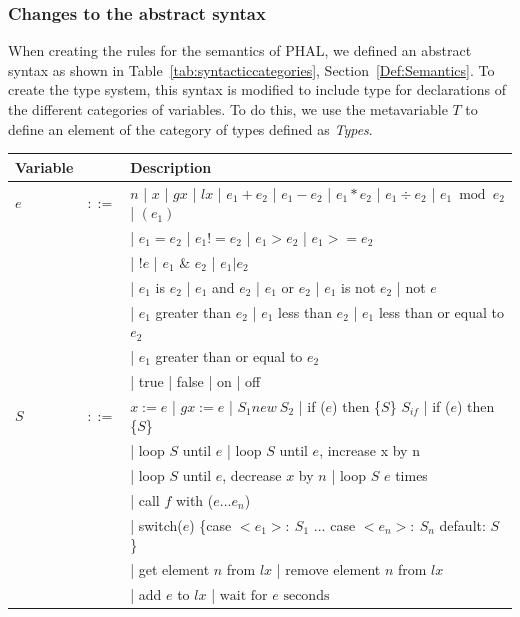 \subsubsection*{Changes to the abstract syntax}
When creating the rules for the semantics of PHAL, we defined an abstract syntax as shown in Table~\ref{tab:syntacticcategories}, Section~\ref{Def:Semantics}. To create the type system, this syntax is modified to include type for declarations of the different categories of variables. To do this, we use the metavariable $T$ to define an element of the category of types defined as \textit{Types}. 
\begin{table}[H]
\centering
\begin{tabular}{@{}lll@{}}
\toprule
Variable &       & Description                      \\ \midrule
$e$       & $::=$ &  $n$ | $x$ | $gx$ | $lx$ | $e_1 + e_2$ | $e_1 - e_2$ | $e_1 * e_2$ | $e_1 \div e_2$ | $e_1 \bmod e_2$ | $ (e_1)  $ \\
          && | $e_1 = e_2$ | $e_1 != e_2$ | $e_1 > e_2$ | $e_1 >= e_2$            \\
            & & | $!e$ | $e_1$ \& $e_2$ | $e_1 | e_2$ \\
            &&  | $e_1$ is $e_2$ | $e_1$ and $e_2$  | $e_1$ or $e_2$ |  $e_1$ is not $e_2$ | not $e$ \\
            &&  | $e_1$ greater than $e_2$  |  $e_1$ less than $e_2$  | $e_1$ less than or equal to $e_2$ \\
            &&  | $e_1$ greater than or equal to $e_2$ \\
            & & | true | false | on | off \\
$S$        & $::=$ & $x:= e$ | $gx := e$ | $S_1 \textit{new} \: S_2$ | if ($e$) then \{$S$\} $S_{if}$ | if ($e$) then \{$S$\} \\
           & & | loop $S$ until $e$ | loop $S$ until $e$, increase x by n    \\
           & & | loop $S$ until $e$, decrease $x$ by $n$ | loop $S$ $e$ times \\
           & & | call $f$ with ($e...e_n$)  \\
           & & | switch($e$) \{case $<e_1>: \: S_1$ $...$ case $<e_n>: \: S_n$ default: $S$ \} \\
           &&  | get element $n$ from $lx$ | remove element $n$ from $lx$  \\
           &&  | add $e$ to $lx$ |  $\text{wait for } e \text{ seconds}$  \\

\end{tabular}
\end{table}

